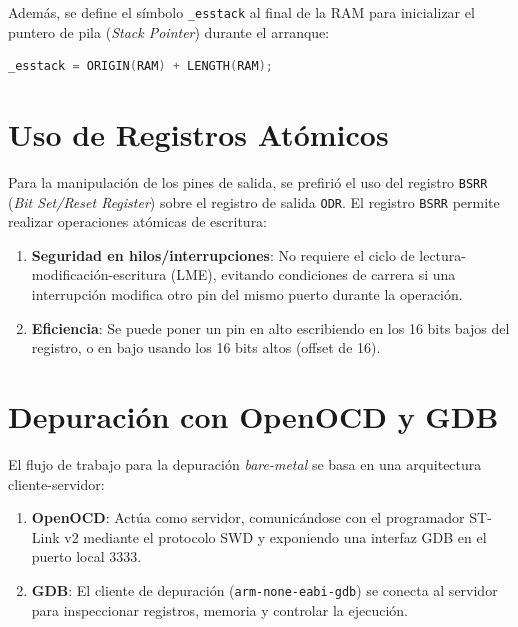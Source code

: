 Además, se define el símbolo \texttt{\_esstack} al final de la RAM para inicializar el 
puntero de pila (\textit{Stack Pointer}) durante el arranque:

\begin{lstlisting}[language=C]
_esstack = ORIGIN(RAM) + LENGTH(RAM);
\end{lstlisting}

\section{Uso de Registros Atómicos}

Para la manipulación de los pines de salida, se prefirió el uso del registro 
\texttt{BSRR} (\textit{Bit Set/Reset Register}) sobre el registro de salida 
\texttt{ODR}. El registro \texttt{BSRR} permite realizar operaciones atómicas de 
escritura:

\begin{enumerate}
    \item \textbf{Seguridad en hilos/interrupciones}: No requiere el ciclo de 
    lectura-modificación-escritura (LME), evitando condiciones de carrera si una 
    interrupción modifica otro pin del mismo puerto durante la operación.
    \item \textbf{Eficiencia}: Se puede poner un pin en alto escribiendo en los 16 bits 
    bajos del registro, o en bajo usando los 16 bits altos (offset de 16).
\end{enumerate}

\section{Depuración con OpenOCD y GDB}

El flujo de trabajo para la depuración \textit{bare-metal} se basa en una arquitectura 
cliente-servidor:

\begin{enumerate}
    \item \textbf{OpenOCD}: Actúa como servidor, comunicándose con el programador ST-Link 
    v2 mediante el protocolo SWD y exponiendo una interfaz GDB en el puerto local 3333.
    \item \textbf{GDB}: El cliente de depuración (\texttt{arm-none-eabi-gdb}) se conecta 
    al servidor para inspeccionar registros, memoria y controlar la ejecución.
\end{enumerate}

